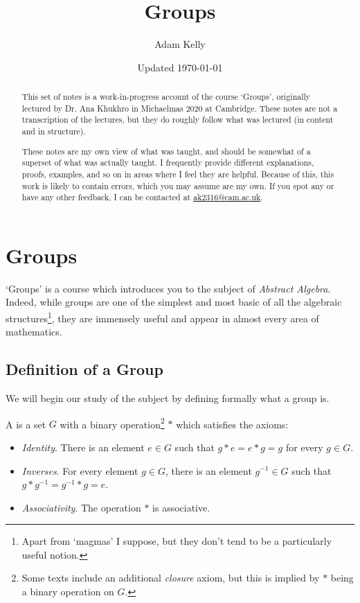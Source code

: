 \documentclass[a4]{scrreprt}
\title{Groups}
\author{Adam Kelly}
\date{Updated \today}
\begin{document}
\maketitle

\begin{abstract}
	This set of notes is a work-in-progress account of the course `Groups', originally lectured by Dr. Ana Khukhro in Michaelmas 2020 at Cambridge. These notes are not a transcription of the lectures, but they do roughly follow what was lectured (in content and in structure).

	These notes are my own view of what was taught, and should be somewhat of a superset of what was actually taught. I frequently provide different explanations, proofs, examples, and so on in areas where I feel they are helpful. Because of this, this work is likely to contain errors, which you may assume are my own. If you spot any or have any other feedback, I can be contacted at \href{mailto:ak2316@cam.ac.uk}{ak2316@cam.ac.uk}.
\end{abstract}

\tableofcontents

\clearpage


\chapter{Groups}

`Groups' is a course which introduces you to the subject of \emph{Abstract Algebra}.
Indeed, while groups are one of the simplest and most basic of all the algebraic structures\footnote{Apart from `magmas' I suppose, but they don't tend to be a particularly useful notion.}, they are immensely useful and appear in almost every area of mathematics. 

\section{Definition of a Group}

We will begin our study of the subject by defining formally what a group is.

\begin{definition}[Group]
	A  is a set $G$ with a binary operation\footnote{Some texts include an additional \emph{closure} axiom, but this is implied by $*$ being a binary operation on $G$.} $*$ which satisfies the axioms:
	\begin{itemize}
		\item \emph{Identity}. There is an element $e \in G$ such that $g * e = e * g = g$ for every $g \in G$.
		\item \emph{Inverses}. For every element $g \in G$, there is an element $g^{-1} \in G$ such that $g * g^{-1} = g^{-1} * g = e$.
		\item \emph{Associativity}. The operation $*$ is associative.
	\end{itemize}
\end{definition}
\end{document}

